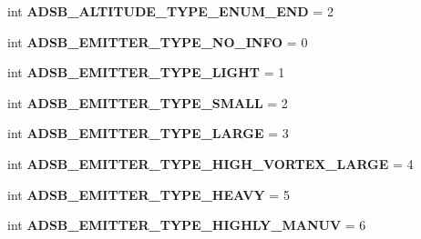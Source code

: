 \begin{DoxyCompactItemize}
\item 
\mbox{\label{namespacepymavlink_1_1dialects_1_1v10_aff5fe76e4cf094a89aeaf376d87866d3}} 
int {\bfseries A\+D\+S\+B\+\_\+\+A\+L\+T\+I\+T\+U\+D\+E\+\_\+\+T\+Y\+P\+E\+\_\+\+E\+N\+U\+M\+\_\+\+E\+ND} = 2
\item 
\mbox{\label{namespacepymavlink_1_1dialects_1_1v10_ae5641a355e4afbcccfbbfe8a0b29d7af}} 
int {\bfseries A\+D\+S\+B\+\_\+\+E\+M\+I\+T\+T\+E\+R\+\_\+\+T\+Y\+P\+E\+\_\+\+N\+O\+\_\+\+I\+N\+FO} = 0
\item 
\mbox{\label{namespacepymavlink_1_1dialects_1_1v10_ac254f7b6323e0b2742bc0c21adbe9fae}} 
int {\bfseries A\+D\+S\+B\+\_\+\+E\+M\+I\+T\+T\+E\+R\+\_\+\+T\+Y\+P\+E\+\_\+\+L\+I\+G\+HT} = 1
\item 
\mbox{\label{namespacepymavlink_1_1dialects_1_1v10_a3cde1a3e95b5e1c119cb537c2f435df1}} 
int {\bfseries A\+D\+S\+B\+\_\+\+E\+M\+I\+T\+T\+E\+R\+\_\+\+T\+Y\+P\+E\+\_\+\+S\+M\+A\+LL} = 2
\item 
\mbox{\label{namespacepymavlink_1_1dialects_1_1v10_a1e9335154efa06f2c7e287e4aa9ac3c7}} 
int {\bfseries A\+D\+S\+B\+\_\+\+E\+M\+I\+T\+T\+E\+R\+\_\+\+T\+Y\+P\+E\+\_\+\+L\+A\+R\+GE} = 3
\item 
\mbox{\label{namespacepymavlink_1_1dialects_1_1v10_a76f3bcb3820393da8324d320ea02dce5}} 
int {\bfseries A\+D\+S\+B\+\_\+\+E\+M\+I\+T\+T\+E\+R\+\_\+\+T\+Y\+P\+E\+\_\+\+H\+I\+G\+H\+\_\+\+V\+O\+R\+T\+E\+X\+\_\+\+L\+A\+R\+GE} = 4
\item 
\mbox{\label{namespacepymavlink_1_1dialects_1_1v10_a675189c6fd5928fb9de41bee14b743c4}} 
int {\bfseries A\+D\+S\+B\+\_\+\+E\+M\+I\+T\+T\+E\+R\+\_\+\+T\+Y\+P\+E\+\_\+\+H\+E\+A\+VY} = 5
\item 
\mbox{\label{namespacepymavlink_1_1dialects_1_1v10_a89a73218adae9014f97d08598bf016e2}} 
int {\bfseries A\+D\+S\+B\+\_\+\+E\+M\+I\+T\+T\+E\+R\+\_\+\+T\+Y\+P\+E\+\_\+\+H\+I\+G\+H\+L\+Y\+\_\+\+M\+A\+N\+UV} = 6

\end{DoxyCompactItemize}
